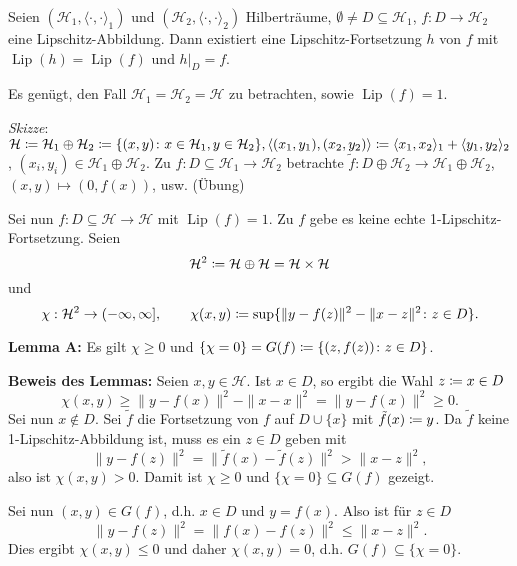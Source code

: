 \documentclass[a4paper,twoside,DIV15,BCOR12mm]{scrbook}
\newcommand{\HR}{\mathcal H}
\DeclareMathOperator{\Lip}{Lip}
\begin{document}
\begin{satz}
Seien \((\HR_1, \langle\cdot,\cdot\rangle_1)\) und \((\HR_2, \langle\cdot,\cdot\rangle_2)\) Hilberträume, \(\emptyset \neq D \subseteq \HR_1\),
\(f:D\rightarrow \HR_2\) eine Lipschitz-Abbildung. Dann existiert eine Lipschitz-Fortsetzung \(h\) von \(f\) mit \(\Lip(h)=\Lip(f)\) und \(h|_D = f\).
\end{satz}
\begin{beweis}
Es genügt, den Fall \(\HR_1 = \HR_2 = \HR\) zu betrachten, sowie \(\Lip(f)=1\).

\emph{Skizze}: \(\HR \da \HR_1 \oplus \HR_2 \da \{ (x,y) \colon x \in \HR_1, y \in \HR_2\}, \langle (x_1,y_1), (x_2,y_2) \rangle \da \langle x_1,x_2\rangle_1 + \langle y_1,y_2 \rangle_2\), \((x_i,y_i) \in \HR_1 \oplus \HR_2\).
Zu \(f:D \subseteq \HR_1 \rightarrow \HR_2\) betrachte \(\tilde f: D \oplus \HR_2 \rightarrow \HR_1 \oplus \HR_2\), \((x,y) \mapsto (0,f(x))\), usw. (Übung)

Sei nun \(f: D \subseteq \HR \rightarrow \HR\) mit \(\Lip(f)=1\). Zu \(f\) gebe es keine echte 1-Lipschitz-Fortsetzung. Seien
\[\HR^2 \da \HR \oplus \HR = \HR \times \HR\]
und \[\chi: \HR^2 \rightarrow (-\infty, \infty], \qquad\chi(x,y) \da \sup\{ \|y-f(z)\|^2 - \|x-z\|^2 \colon z \in D\}.\]

\textbf{Lemma A:}
Es gilt \(\chi \geq 0\) und \(\{\chi=0\} = G(f) \da \{(z,f(z)) \colon z \in D\}\).

\textbf{Beweis des Lemmas:}
Seien \(x,y \in \HR\). Ist \(x \in D\), so ergibt die Wahl \(z \da x \in D\)
\[\chi(x,y) \geq \|y-f(x)\|^2 - \|x-x\|^2 = \|y-f(x)\|^2 \geq 0.\] 
Sei nun \(x \notin D\). Sei \(\tilde f\) die Fortsetzung von \(f\) auf \(D \cup \{x\}\) mit \(\tilde f(x) \da y\). Da \(\tilde f\) keine 1-Lipschitz-Abbildung ist, muss es ein \(z \in D\) geben mit
\[
\|y-f(z)\|^2 = \|\tilde f(x) - \tilde f(z)\|^2 > \|x-z\|^2,
\]
also ist \(\chi(x,y) > 0\). Damit ist \(\chi \geq 0 \) und \(\{\chi = 0\} \subseteq G(f)\) gezeigt.
\par
Sei nun \((x,y) \in G(f)\), d.h. \(x\in D\) und \(y=f(x)\). Also ist für $z\in D$
\[
\|y-f(z)\|^2 = \|f(x)-f(z)\|^2 \leq \|x-z\|^2.
\]
Dies ergibt \(\chi(x,y) \leq 0\) und daher \( \chi(x,y) = 0\), d.h. \(G(f) \subseteq \{\chi=0\}\).


\end{beweis}
\end{document}
